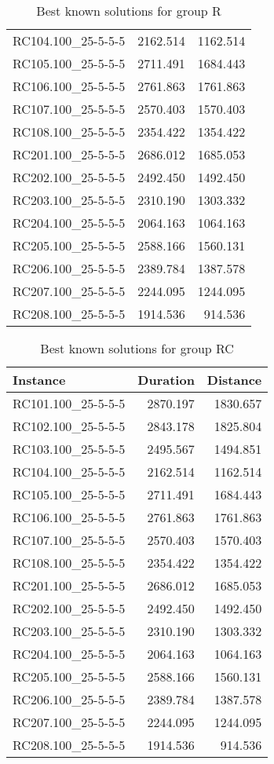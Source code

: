 \begin{table}
\begin{tabular}{lrr}
RC104.100_25-5-5-5 &     2162.514 &     1162.514 \\ 
RC105.100_25-5-5-5 &     2711.491 &     1684.443 \\ 
RC106.100_25-5-5-5 &     2761.863 &     1761.863 \\ 
RC107.100_25-5-5-5 &     2570.403 &     1570.403 \\ 
RC108.100_25-5-5-5 &     2354.422 &     1354.422 \\ 
RC201.100_25-5-5-5 &     2686.012 &     1685.053 \\ 
RC202.100_25-5-5-5 &     2492.450 &     1492.450 \\ 
RC203.100_25-5-5-5 &     2310.190 &     1303.332 \\ 
RC204.100_25-5-5-5 &     2064.163 &     1064.163 \\ 
RC205.100_25-5-5-5 &     2588.166 &     1560.131 \\ 
RC206.100_25-5-5-5 &     2389.784 &     1387.578 \\ 
RC207.100_25-5-5-5 &     2244.095 &     1244.095 \\ 
RC208.100_25-5-5-5 &     1914.536 &      914.536 \\ 
\hline
\end{tabular}
\caption{Best known solutions for group R} \label{tab:ap-bks-R}
\end{table}
\begin{table}
\begin{tabular}{lrr}
\hline
 \textbf{Instance} & \textbf{Duration} & \textbf{Distance} \\
\hline
RC101.100_25-5-5-5 &     2870.197 &     1830.657 \\ 
RC102.100_25-5-5-5 &     2843.178 &     1825.804 \\ 
RC103.100_25-5-5-5 &     2495.567 &     1494.851 \\ 
RC104.100_25-5-5-5 &     2162.514 &     1162.514 \\ 
RC105.100_25-5-5-5 &     2711.491 &     1684.443 \\ 
RC106.100_25-5-5-5 &     2761.863 &     1761.863 \\ 
RC107.100_25-5-5-5 &     2570.403 &     1570.403 \\ 
RC108.100_25-5-5-5 &     2354.422 &     1354.422 \\ 
RC201.100_25-5-5-5 &     2686.012 &     1685.053 \\ 
RC202.100_25-5-5-5 &     2492.450 &     1492.450 \\ 
RC203.100_25-5-5-5 &     2310.190 &     1303.332 \\ 
RC204.100_25-5-5-5 &     2064.163 &     1064.163 \\ 
RC205.100_25-5-5-5 &     2588.166 &     1560.131 \\ 
RC206.100_25-5-5-5 &     2389.784 &     1387.578 \\ 
RC207.100_25-5-5-5 &     2244.095 &     1244.095 \\ 
RC208.100_25-5-5-5 &     1914.536 &      914.536 \\ 
\hline
\end{tabular}
\caption{Best known solutions for group RC} \label{tab:ap-bks-RC}
\end{table}

